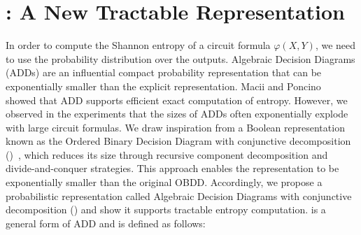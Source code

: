 \section{\ADDAND: A New Tractable Representation}
\label{sec:ADDAND}

In order to compute the Shannon entropy of a circuit formula $\varphi(X, Y)$, we need to use the probability distribution over the outputs.
Algebraic Decision Diagrams (ADDs) are an influential compact probability representation that can be exponentially smaller than the explicit representation.
Macii and Poncino~\cite{macii1996exact} showed that ADD supports efficient exact computation of entropy.
However, we observed in the experiments that the sizes of ADDs often exponentially explode with large circuit formulas.
We draw inspiration from a Boolean representation known as the Ordered Binary Decision Diagram with conjunctive decomposition (\OBDDAND)~\cite{lai2017new}, which reduces its size through recursive component decomposition and divide-and-conquer strategies. 
This approach enables the representation to be exponentially smaller than the original OBDD.
Accordingly, we propose a probabilistic representation called Algebraic Decision Diagrams with conjunctive decomposition (\ADDAND) and show it supports tractable entropy computation.
\ADDAND is a general form of ADD and is defined as follows:

